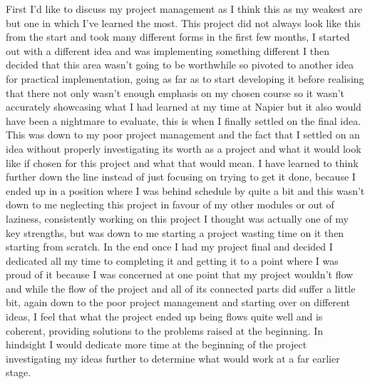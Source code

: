 \documentclass[12pt,a4paper]{article}
\begin{document}
First I'd like to discuss my project management as I think this as my weakest are but one in which I've learned the most. This project did not always look like this from the start and took many different forms in the first few months, I started out with a different idea and was implementing something different I then decided that this area wasn't going to be worthwhile so pivoted to another idea for practical implementation, going as far as to start developing it before realising that there not only wasn't enough emphasis on my chosen course so it wasn't accurately showcasing what I had learned at my time at Napier but it also would have been a nightmare to evaluate, this is when I finally settled on the final idea. This was down to my poor project management and the fact that I settled on an idea without properly investigating its worth as a project and what it would look like if chosen for this project and what that would mean. I have learned to think further down the line instead of just focusing on trying to get it done, because I ended up in a position where I was behind schedule by quite a bit and this wasn't down to me neglecting this project in favour of my other modules or out of laziness, consistently working on this project I thought was actually one of my key strengths, but was down to me starting a project wasting time on it then starting from scratch. In the end once I had my project final and decided I dedicated all my time to completing it and getting it to a point where I was proud of it because I was concerned at one point that my project wouldn't flow and while the flow of the project and all of its connected parts did suffer a little bit, again down to the poor project management and starting over on different ideas, I feel that what the project ended up being flows quite well and is coherent, providing solutions to the problems raised at the beginning. In hindsight I would dedicate more time at the beginning of the project investigating my ideas further to determine what would work at a far earlier stage. 
\end{document}
